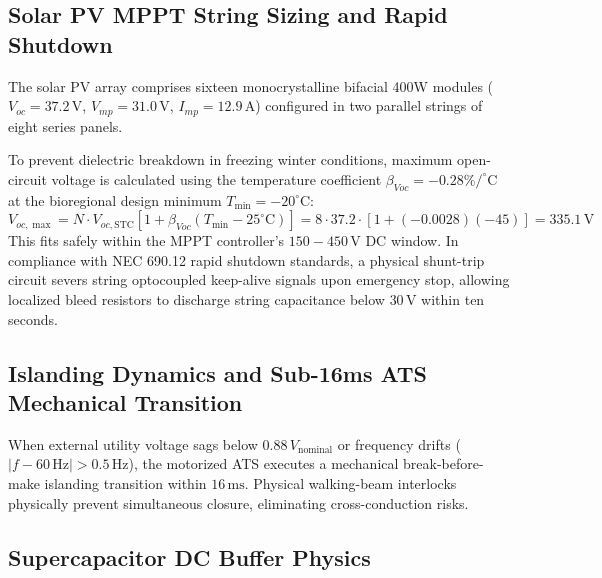 \subsection{Solar PV MPPT String Sizing and Rapid Shutdown}

The solar PV array comprises sixteen monocrystalline bifacial 400W modules ($V_{oc} = 37.2\,\mathrm{V}$, $V_{mp} = 31.0\,\mathrm{V}$, $I_{mp} = 12.9\,\mathrm{A}$) configured in two parallel strings of eight series panels. 

To prevent dielectric breakdown in freezing winter conditions, maximum open-circuit voltage is calculated using the temperature coefficient $\beta_{Voc} = -0.28\%/^\circ\mathrm{C}$ at the bioregional design minimum $T_{\min} = -20^\circ\mathrm{C}$:
\begin{equation}
V_{oc,\max} = N \cdot V_{oc,\mathrm{STC}} \left[ 1 + \beta_{Voc} (T_{\min} - 25^\circ\mathrm{C}) \right] = 8 \cdot 37.2 \cdot \left[ 1 + (-0.0028)(-45) \right] = 335.1\,\mathrm{V}
\label{eq:voc_max}
\end{equation}
This fits safely within the MPPT controller's $150-450\,\mathrm{V}$ DC window. In compliance with NEC 690.12 rapid shutdown standards, a physical shunt-trip circuit severs string optocoupled keep-alive signals upon emergency stop, allowing localized bleed resistors to discharge string capacitance below $30\,\mathrm{V}$ within ten seconds.

\subsection{Islanding Dynamics and Sub-16ms ATS Mechanical Transition}

When external utility voltage sags below $0.88\,V_{\mathrm{nominal}}$ or frequency drifts ($|f - 60\,\mathrm{Hz}| > 0.5\,\mathrm{Hz}$), the motorized ATS executes a mechanical break-before-make islanding transition within $16\,\mathrm{ms}$. Physical walking-beam interlocks physically prevent simultaneous closure, eliminating cross-conduction risks.

\subsection{Supercapacitor DC Buffer Physics}

